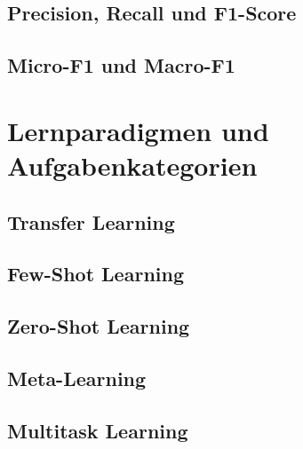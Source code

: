 \subsection{Precision, Recall und F1-Score}
\label{subsec:precision-recall-f1}

\subsection{Micro-F1 und Macro-F1}
\label{subsec:micro-macro-f1}

\section{Lernparadigmen und Aufgabenkategorien}
\label{sec:lernparadigmen-aufgabenkategorien}

\subsection{Transfer Learning}
\label{subsec:transfer-learning}

\subsection{Few-Shot Learning}
\label{subsec:few-shot-learning}

\subsection{Zero-Shot Learning}
\label{subsec:zero-shot-learning}

\subsection{Meta-Learning}
\label{subsec:meta-learning}

\subsection{Multitask Learning}
\label{subsec:multitask-learning}
